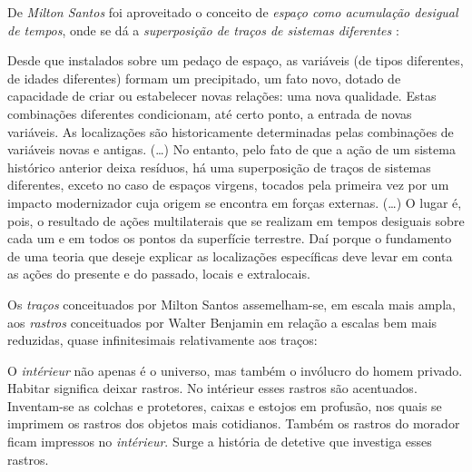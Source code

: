 De \textit{Milton Santos} foi aproveitado o conceito de \textit{espaço como acumulação desigual de tempos}, onde se dá a \textit{superposição de traços de sistemas diferentes} \cite[p.~256-257]{SANTOS2008}:

\begin{citacao}
Desde que instalados sobre um pedaço de espaço, as variáveis (de tipos diferentes, de idades diferentes) formam um precipitado, um fato novo, dotado de capacidade de criar ou estabelecer novas relações: uma nova qualidade. Estas combinações diferentes condicionam, até certo ponto, a entrada de novas variáveis. As localizações são historicamente determinadas pelas combinações de variáveis novas e antigas. (…) No entanto, pelo fato de que a ação de um sistema histórico anterior deixa resíduos, há uma superposição de traços de sistemas diferentes, exceto no caso de espaços virgens, tocados pela primeira vez por um impacto modernizador cuja origem se encontra em forças externas. (…) O lugar é, pois, o resultado de ações multilaterais que se realizam em tempos desiguais sobre cada um e em todos os pontos da superfície terrestre. Daí porque o fundamento de uma teoria que deseje explicar as localizações específicas deve levar em conta as ações do presente e do passado, locais e extralocais. \cite[p.~256-258]{SANTOS2008}
\end{citacao}

Os \textit{traços} conceituados por Milton Santos assemelham-se, em escala mais ampla, aos \textit{rastros} conceituados por Walter Benjamin em relação a escalas bem mais reduzidas, quase infinitesimais relativamente aos traços:

\begin{citacao}
O \textit{intérieur} não apenas é o universo, mas também o invólucro do homem privado. Habitar significa deixar rastros. No intérieur esses rastros são acentuados. Inventam-se as colchas e protetores, caixas e estojos em profusão, nos quais se imprimem os rastros dos objetos mais cotidianos. Também os rastros do morador ficam impressos no \textit{intérieur}. Surge a história de detetive que investiga esses rastros. \cite[p.~46]{benjamin_passagens_2006}
\end{citacao}

